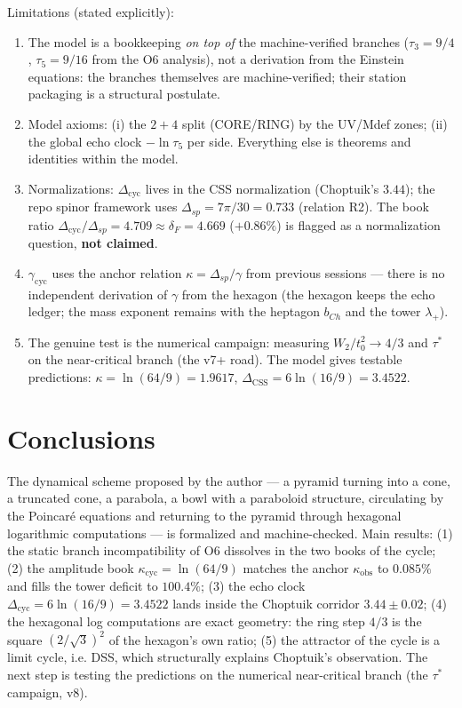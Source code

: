 \documentclass[11pt,a4paper]{article}
\newcommand{\kap}{\kappa_{\mathrm{cyc}}}
\newcommand{\Dcy}{\Delta_{\mathrm{cyc}}}
\newcommand{\tauu}{\tau_{3}}
\newcommand{\tauf}{\tau_{5}}
\begin{document}
Limitations (stated explicitly):
\begin{enumerate}
\item The model is a bookkeeping \emph{on top of} the machine-verified
branches ($\tauu = 9/4$, $\tauf = 9/16$ from the O6 analysis), not a
derivation from the Einstein equations: the branches themselves are
machine-verified; their station packaging is a structural postulate.
\item Model axioms: (i) the $2+4$ split (CORE/RING) by the UV/Mdef zones;
(ii) the global echo clock $-\ln\tauf$ per side. Everything else is theorems
and identities within the model.
\item Normalizations: $\Dcy$ lives in the CSS normalization (Choptuik's
$3.44$); the repo spinor framework uses $\Delta_{sp} = 7\pi/30 = 0.733$
(relation R2). The book ratio $\Dcy/\Delta_{sp} = 4.709 \approx \delta_F =
4.669$ ($+0.86\%$) is flagged as a normalization question, \textbf{not
claimed}.
\item $\gamma_{\mathrm{cyc}}$ uses the anchor relation
$\kappa = \Delta_{sp}/\gamma$ from previous sessions --- there is no
independent derivation of $\gamma$ from the hexagon (the hexagon keeps the
echo ledger; the mass exponent remains with the heptagon $b_{Ch}$ and the
tower $\lambda_+$).
\item The genuine test is the numerical campaign: measuring
$W_2/t_0^2 \to 4/3$ and $\tau^*$ on the near-critical branch (the v7+ road).
The model gives testable predictions: $\kappa = \ln(64/9) = 1.9617$,
$\Delta_{\mathrm{CSS}} = 6\ln(16/9) = 3.4522$.
\end{enumerate}

\section{Conclusions}

The dynamical scheme proposed by the author --- a pyramid turning into a
cone, a truncated cone, a parabola, a bowl with a paraboloid structure,
circulating by the Poincar\'e equations and returning to the pyramid through
hexagonal logarithmic computations --- is formalized and machine-checked.
Main results: (1) the static branch incompatibility of O6 dissolves in the
two books of the cycle; (2) the amplitude book $\kap = \ln(64/9)$ matches the
anchor $\kappa_{\mathrm{obs}}$ to $0.085\%$ and fills the tower deficit to
$100.4\%$; (3) the echo clock $\Dcy = 6\ln(16/9) = 3.4522$ lands inside the
Choptuik corridor $3.44 \pm 0.02$; (4) the hexagonal log computations are
exact geometry: the ring step $4/3$ is the square $(2/\sqrt3)^2$ of the
hexagon's own ratio; (5) the attractor of the cycle is a limit cycle, i.e.
DSS, which structurally explains Choptuik's observation. The next step is
testing the predictions on the numerical near-critical branch (the $\tau^*$
campaign, v8).
\end{document}
